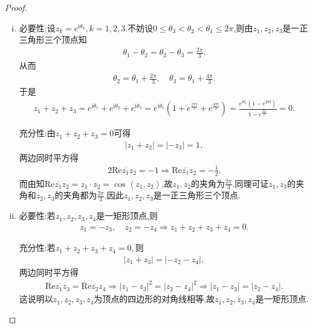 \documentclass[../../main.tex]{subfiles}%
\begin{document}
\begin{proof}
\begin{enumerate}[(1)]
\begin{enumerate}[(i)]
\item {\heiti 必要性:}设$z_k=e^{\mathrm{i}\theta _k},k=1,2,3.$不妨设$0\leqslant \theta _3<\theta _2<\theta _1\leqslant 2\pi$,则由$z_1,z_2,z_3$是一正三角形三个顶点知
\begin{align*}
\theta _1-\theta _2=\theta _2-\theta _3=\frac{2\pi}{3}.
\end{align*}
从而
\begin{align*}
\theta _2=\theta _1+\frac{2\pi}{3},\quad \theta _3=\theta _1+\frac{4\pi}{3}.
\end{align*}
于是
\begin{align*}
z_1+z_2+z_3=e^{\mathrm{i}\theta _1}+e^{\mathrm{i}\theta _2}+e^{\mathrm{i}\theta _3}=e^{\mathrm{i}\theta _1}\left( 1+e^{\frac{2\pi \mathrm{i}}{3}}+e^{\frac{4\pi \mathrm{i}}{3}} \right) =\frac{e^{\mathrm{i}\theta _1}\left( 1-e^{2\pi \mathrm{i}} \right)}{1-e^{\frac{2\pi \mathrm{i}}{3}}}=0.
\end{align*}

{\heiti 充分性:}由$z_1+z_2+z_3=0$可得
\begin{align*}
\left| z_1+z_2 \right|=\left| -z_3 \right|=1,
\end{align*}
两边同时平方得
\begin{align*}
2\mathrm{Re}\overline{z_1}z_2=-1\Longrightarrow \mathrm{Re}\overline{z_1}z_2=-\frac{1}{2}.
\end{align*}
而由知$\mathrm{Re}\overline{z_1}z_2=z_1\cdot z_2=\cos \left< z_1,z_2 \right>$,故$z_1,z_2$的夹角为$\frac{2\pi}{3}.$同理可证$z_1,z_3$的夹角和$z_2,z_3$的夹角都为$\frac{2\pi}{3}.$因此$z_1,z_2,z_3$是一正三角形三个顶点.

\item {\heiti 必要性:}若$z_1,z_2,z_3,z_4$是一矩形顶点,则
\begin{align*}
z_1=-z_3,\quad z_2=-z_4\Longrightarrow z_1+z_2+z_3+z_4=0.
\end{align*}

{\heiti 充分性:}若$z_1+z_2+z_3+z_4=0,$则
\begin{align*}
\left| z_1+z_3 \right|=\left| -z_2-z_4 \right|,
\end{align*}
两边同时平方得
\begin{align*}
\mathrm{Re}\overline{z_1}z_3=\mathrm{Re}\overline{z_2}z_4\Longrightarrow \left| z_1-z_3 \right|^2=\left| z_2-z_4 \right|^2\Longrightarrow \left| z_1-z_3 \right|=\left| z_2-z_4 \right|.
\end{align*}
这说明以$z_1,z_2,z_3,z_4$为顶点的四边形的对角线相等,故$z_1,z_2,z_3,z_4$是一矩形顶点.
\end{enumerate}


\end{enumerate}
\end{proof}
\end{document}
